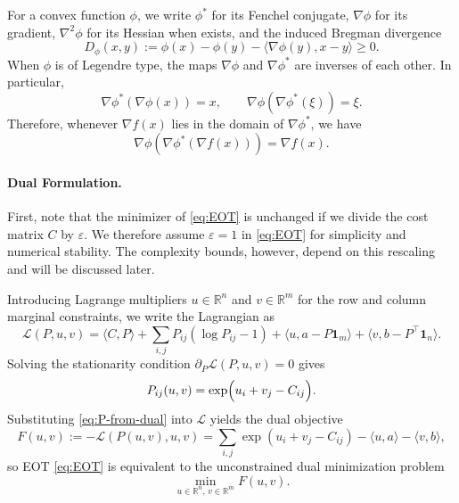 \documentclass{article}
\theoremstyle{plain}
\theoremstyle{remark}
\begin{document}
For a convex function $\phi$, we write $\phi^*$ for its Fenchel conjugate, $\nabla\phi$ for its gradient, $\nabla^2\phi$ for its Hessian when exists, and the induced Bregman divergence
$$
D_\phi(x,y):=\phi(x)-\phi(y)-\langle \nabla\phi(y),x-y\rangle \ge 0.
$$
When $\phi$ is of Legendre type, the maps $\nabla\phi$ and $\nabla\phi^*$ are inverses of each other. In particular,
$$
\nabla\phi^*(\nabla\phi(x))=x,
\qquad
\nabla\phi(\nabla\phi^*(\xi))=\xi.
$$
Therefore, whenever $\nabla f(x)$ lies in the domain of $\nabla\phi^*$, we  have
\begin{equation}\label{eq:dphiphistar}
\nabla\phi(\nabla\phi^*(\nabla f(x)))=\nabla f(x).
\end{equation}




\paragraph{Dual Formulation.}
First, note that the minimizer of \eqref{eq:EOT} is unchanged if we divide the cost matrix $C$ by $\varepsilon$. We therefore assume $\varepsilon=1$ in \eqref{eq:EOT} for simplicity and numerical stability. The complexity bounds, however, depend on this rescaling and will be discussed later.

Introducing Lagrange multipliers $u\in\mathbb{R}^n$ and $v\in\mathbb{R}^m$ for the row and column marginal constraints, we write the Lagrangian as
$$
\mathcal{L}(P,u,v)=\langle C,P\rangle+\sum_{i,j}P_{ij}(\log P_{ij}-1)+\langle u,a-P\mathbf{1}_m\rangle+\langle v,b-P^\top\mathbf{1}_n\rangle.
$$
Solving the stationarity condition $\partial_P \mathcal{L}(P,u,v)=0$ gives
\begin{equation}\label{eq:P-from-dual}
P_{ij}(u,v)=\exp\Bigl(u_i+v_j-C_{ij}\Bigr).
\end{equation}
Substituting \eqref{eq:P-from-dual} into $\mathcal{L}$ yields the dual objective
\begin{equation}\label{eq:dual-obj}
F(u,v):=- \mathcal L (P(u,v), u, v) = \sum_{i,j}\exp(u_i+v_j-C_{ij})-\langle u,a\rangle-\langle v,b\rangle,
\end{equation}
so EOT \eqref{eq:EOT} is equivalent to the unconstrained dual minimization problem
\begin{equation}\label{eq:dual-min}
\min_{u\in\mathbb{R}^n,\,v\in\mathbb{R}^m} F(u,v).
\end{equation}
\end{document}
